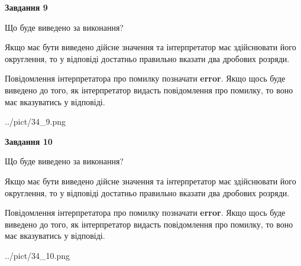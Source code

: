 \documentclass[12pt, ukrainian]{article}
\begin{document}
{\begin {Large}
{\begin {center}\textbf{Завдання 9}\end {center}}\par
Що буде виведено за виконання? \par

Якщо має бути виведено дійсне значення та інтерпретатор має здійснювати його округлення, 
то у відповіді достатньо правильно вказати два дробових розряди.

Повідомлення інтерпретатора про помилку позначати \textbf{error}.
Якщо щось буде виведено до того, як інтерпретатор видасть повідомлення про помилку, 
то воно має вказуватись у відповіді. \par

\begin{center}
	{../pict/34_9.png}
\end{center}
\newpage

{\begin {center}\textbf{Завдання 10}\end {center}}\par
Що буде виведено за виконання? \par

Якщо має бути виведено дійсне значення та інтерпретатор має здійснювати його округлення, 
то у відповіді достатньо правильно вказати два дробових розряди.

Повідомлення інтерпретатора про помилку позначати \textbf{error}.
Якщо щось буде виведено до того, як інтерпретатор видасть повідомлення про помилку, 
то воно має вказуватись у відповіді. \par

\begin{center}
	{../pict/34_10.png}
\end{center}
\newpage

\end {Large}}
\end{document}
